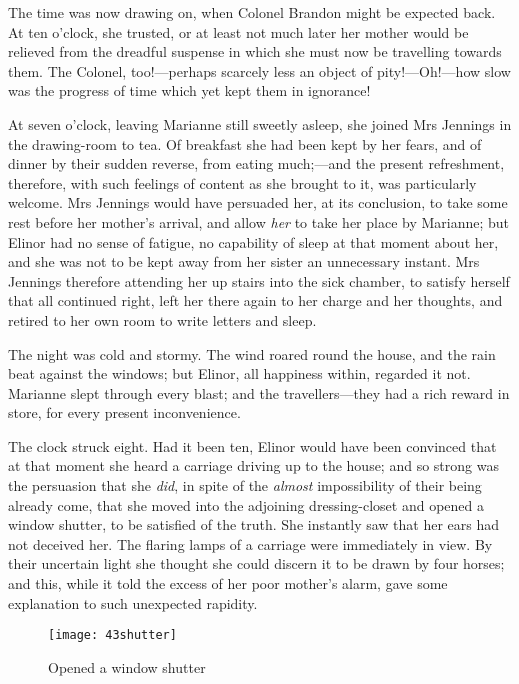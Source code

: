 The time was now drawing on, when Colonel Brandon might be expected back. At ten o’clock, she trusted, or at least not much later her mother would be relieved from the dreadful suspense in which she must now be travelling towards them. The Colonel, too!—perhaps scarcely less an object of pity!—Oh!—how slow was the progress of time which yet kept them in ignorance!

At seven o’clock, leaving Marianne still sweetly asleep, she joined Mrs Jennings in the drawing-room to tea. Of breakfast she had been kept by her fears, and of dinner by their sudden reverse, from eating much;—and the present refreshment, therefore, with such feelings of content as she brought to it, was particularly welcome. Mrs Jennings would have persuaded her, at its conclusion, to take some rest before her mother’s arrival, and allow \textit{her} to take her place by Marianne; but Elinor had no sense of fatigue, no capability of sleep at that moment about her, and she was not to be kept away from her sister an unnecessary instant. Mrs Jennings therefore attending her up stairs into the sick chamber, to satisfy herself that all continued right, left her there again to her charge and her thoughts, and retired to her own room to write letters and sleep.

The night was cold and stormy. The wind roared round the house, and the rain beat against the windows; but Elinor, all happiness within, regarded it not. Marianne slept through every blast; and the travellers—they had a rich reward in store, for every present inconvenience.

The clock struck eight. Had it been ten, Elinor would have been convinced that at that moment she heard a carriage driving up to the house; and so strong was the persuasion that she \textit{did}, in spite of the \textit{almost} impossibility of their being already come, that she moved into the adjoining dressing-closet and opened a window shutter, to be satisfied of the truth. She instantly saw that her ears had not deceived her. The flaring lamps of a carriage were immediately in view. By their uncertain light she thought she could discern it to be drawn by four horses; and this, while it told the excess of her poor mother’s alarm, gave some explanation to such unexpected rapidity.

\begin{a4}
	\begin{figure}[tbph]
		\centering
		\texttt{[image: 43shutter]}
		\caption{Opened a window shutter}
	\end{figure}
\end{a4}


